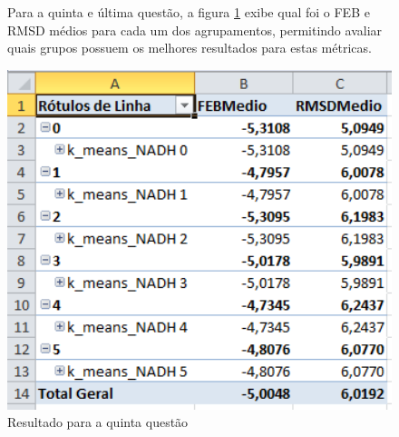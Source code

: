 \begin{figure}[h]
Para a quinta e última questão, a figura \ref{fig:questao5} exibe qual foi o FEB e RMSD médios para cada um dos agrupamentos, permitindo avaliar quais grupos possuem os melhores resultados para estas métricas.

\end{figure}\begin{figure}[h]
        \center
        \includegraphics[width=14cm]{images/Questao5.PNG}
        \caption{Resultado para a quinta questão}
        \label{fig:questao5}
\end{figure}
